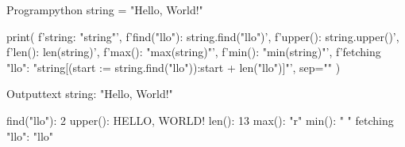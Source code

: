 \documentclass[11pt]{ipu-python}
\begin{document}
    \maketitle
    

    \newpage{}\pagestyle{fancy}\vspace*{10pt}
    \begin{code}
        {Program}{python}
string = "Hello, World!"

print(
    f'string: "{string}"\n',
    f'find("llo"): {string.find("llo")}',
    f'upper(): {string.upper()}',
    f'len(): {len(string)}',
    f'max(): "{max(string)}"',
    f'min(): "{min(string)}"',
    f'fetching "llo": "{string[(start := string.find("llo")):start + len("llo")]}"',
    sep="\n"
)
    \end{code}
    \begin{code}
        {Output}{text}
string: "Hello, World!"

find("llo"): 2
upper(): HELLO, WORLD!
len(): 13
max(): "r"
min(): " "
fetching "llo": "llo"
    \end{code}
\end{document}

